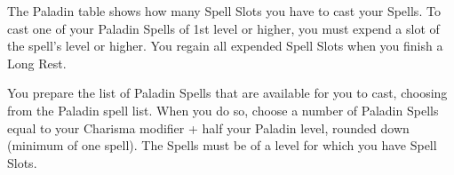 \begin{multicols}{2}
{\scriptsize
The Paladin table shows how many Spell Slots you have to cast your
Spells. To cast one of your Paladin Spells of 1st level or
higher, you must expend a slot of the spell's level or higher.
You regain all expended Spell Slots when you finish a Long
Rest.\par
\vspace{0.5em}
You prepare the list of Paladin Spells that are available for you to
cast, choosing from the Paladin spell list. When you do so, choose a
number of Paladin Spells equal to your Charisma modifier + half your
Paladin level, rounded down (minimum of one spell). The Spells must be
of a level for which you have Spell Slots.\par
} %
\end{multicols}
{\scriptsize
{}}
\par
\vspace{1em}

